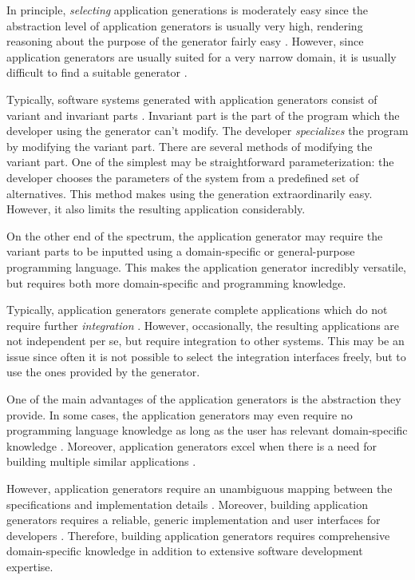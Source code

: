 In principle, \emph{selecting} application generations is moderately easy since the abstraction level of application generators is usually very high, rendering reasoning about the purpose of the generator fairly easy \citep[chap.~7]{krueger_software_1992}. However, since application generators are usually suited for a very narrow domain, it is usually difficult to find a suitable generator \citep[chap.~7]{krueger_software_1992}.

Typically, software systems generated with application generators consist of variant and invariant parts \citep[chap.~7]{krueger_software_1992}. Invariant part is the part of the program which the developer using the generator can't modify. The developer \emph{specializes} the program by modifying the variant part. There are several methods of modifying the variant part. One of the simplest may be straightforward parameterization: the developer chooses the parameters of the system from a predefined set of alternatives. This method makes using the generation extraordinarily easy. However, it also limits the resulting application considerably.

On the other end of the spectrum, the application generator may require the variant parts to be inputted using a domain-specific or general-purpose programming language. This makes the application generator incredibly versatile, but requires both more domain-specific and programming knowledge.

Typically, application generators generate complete applications which do not require further \emph{integration} \citep[chap.~7]{krueger_software_1992}. However, occasionally, the resulting applications are not independent per se, but require integration to other systems. This may be an issue since often it is not possible to select the integration interfaces freely, but to use the ones provided by the generator.

One of the main advantages of the application generators is the abstraction they provide. In some cases, the application generators may even require no programming language knowledge as long as the user has relevant domain-specific knowledge \citep{horowitz_survey_1985}. Moreover, application generators excel when there is a need for building multiple similar applications \citep[chap.~7]{krueger_software_1992}. 

However, application generators require an unambiguous mapping between the specifications and implementation details \citep[chap.~7]{krueger_software_1992}. Moreover, building application generators requires a reliable, generic implementation and user interfaces for developers \citep{cleaveland_building_1988}. Therefore, building application generators requires comprehensive domain-specific knowledge in addition to extensive software development expertise.


